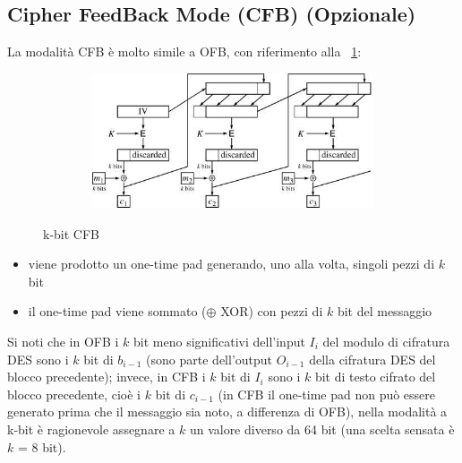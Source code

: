 \subsection{Cipher FeedBack Mode (CFB) (Opzionale)}
La modalità CFB è molto simile a OFB, con riferimento alla \figurename ~\ref{fig:k-bit_CFB}:
\begin{figure}[htbp]
	\centering%
	\subfigure%
	{\includegraphics[height=4cm, width=12cm, keepaspectratio]{Immagini/modalita_operative/k-bit_CFB.png}}
	\caption{k-bit CFB \label{fig:k-bit_CFB}} 	
\end{figure}
\begin{itemize}
\item viene prodotto un one-time pad generando, uno alla volta, singoli pezzi di $k$ bit
\item il one-time pad viene sommato ($\oplus$ XOR) con pezzi di $k$ bit del messaggio
\end{itemize}
Si noti che in OFB i $k$ bit meno significativi dell'input $I_{i}$ del modulo di cifratura DES sono i $k$ bit di $b_{i-1}$ (sono parte dell'output $O_{i-1}$ della cifratura DES del blocco precedente); invece, in CFB i $k$ bit di $I_{i}$ sono i $k$ bit di testo cifrato del blocco precedente, cioè i $k$ bit di $c_{i-1}$ (in CFB il one-time pad non può essere generato prima che il messaggio sia noto, a differenza di OFB), nella modalità a k-bit è ragionevole assegnare a $k$ un valore diverso da 64 bit (una scelta sensata è $k$ = 8 bit).
